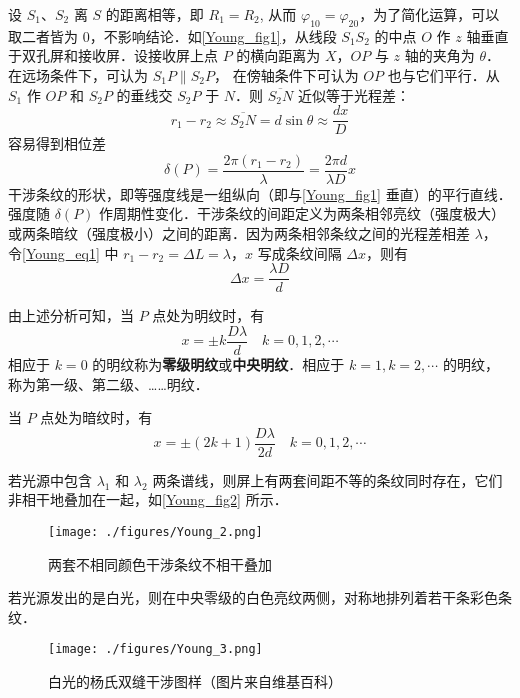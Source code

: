 设 $S_1$、$S_2$ 离 $S$ 的距离相等，即 $R_1=R_2$, 从而 $\varphi_{10}=\varphi_{20}$，为了简化运算，可以取二者皆为 $0$，不影响结论．如\autoref{Young_fig1}，从线段 $S_1S_2$ 的中点 $O$ 作 $z$ 轴垂直于双孔屏和接收屏．设接收屏上点 $P$ 的横向距离为 $X$，$OP$ 与 $z$ 轴的夹角为 $\theta$．在远场条件下，可认为 $S_1P\parallel S_2P$， 在傍轴条件下可认为 $OP$ 也与它们平行．从 $S_1$ 作 $OP$ 和 $S_2P$ 的垂线交 $S_2P$ 于 $N$．则 $\overline{S_2N}$ 近似等于光程差：
\begin{equation} \label{Young_eq1}
r_{1}-r_{2} \approx \overline{S_{2} N}=d \sin \theta \approx \frac{d x}{D}
\end{equation}
容易得到相位差
\begin{equation}
\delta(P)=\frac{2 \pi\left(r_{1}-r_{2}\right)}{\lambda}=\frac{2 \pi d}{\lambda D} x
\end{equation}
干涉条纹的形状，即等强度线是一组纵向（即与\autoref{Young_fig1} 垂直）的平行直线．强度随 $\delta(P)$ 作周期性变化．干涉条纹的间距定义为两条相邻亮纹（强度极大）或两条暗纹（强度极小）之间的距离．因为两条相邻条纹之间的光程差相差 $\lambda$， 令\autoref{Young_eq1} 中 $r_1-r_2=\Delta L=\lambda$，$ x $ 写成条纹间隔 $\Delta x$，则有
\begin{equation}
\Delta x=\frac{\lambda D}{d}
\end{equation}

由上述分析可知，当 $P$ 点处为明纹时，有
\begin{equation}
x=\pm k \frac{D \lambda}{d} \quad k=0,1,2, \cdots
\end{equation}
相应于 $k=0$ 的明纹称为\textbf{零级明纹}或\textbf{中央明纹}．相应于 $k=1, k=2, \cdots$ 的明纹，称为第一级、第二级、……明纹．

当 $P$ 点处为暗纹时，有
\begin{equation}
x=\pm(2 k+1) \frac{D \lambda}{2 d} \quad k=0,1,2, \cdots
\end{equation}

若光源中包含 $\lambda_1$ 和 $\lambda_2$ 两条谱线，则屏上有两套间距不等的条纹同时存在，它们非相干地叠加在一起，如\autoref{Young_fig2} 所示．
\begin{figure}[ht]
\centering
\texttt{[image: ./figures/Young\_2.png]}
\caption{两套不相同颜色干涉条纹不相干叠加} \label{Young_fig2}
\end{figure}
若光源发出的是白光，则在中央零级的白色亮纹两侧，对称地排列着若干条彩色条纹．
\begin{figure}[ht]
\centering
\texttt{[image: ./figures/Young\_3.png]}
\caption{白光的杨氏双缝干涉图样（图片来自维基百科）} \label{Young_fig3}
\end{figure}
